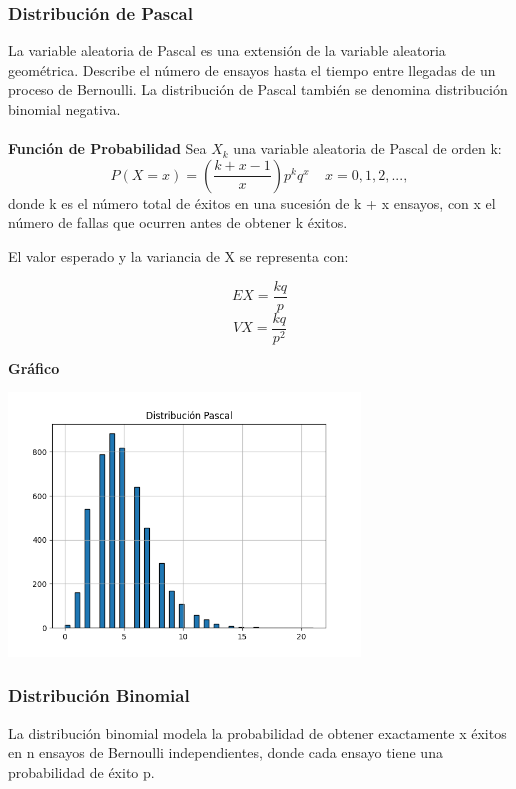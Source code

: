 \documentclass[11pt]{article}
\begin{document}
\subsubsection{Distribución de Pascal}
La variable aleatoria de Pascal es una extensión de la variable aleatoria geométrica. Describe el número de ensayos hasta el tiempo entre llegadas de un proceso de Bernoulli. La distribución de Pascal también se denomina distribución binomial negativa.
\\ \\
\noindent\textbf{Función de Probabilidad\newline}
Sea $X_k$ una variable aleatoria de Pascal de orden k:
 \begin{equation}
    P(X = x) = (\frac{k+x-1}{x})p^{k}q^{x} \ \text{   } \ x = 0,1,2,...,
  \end{equation}
  donde k es el número total de éxitos en una sucesión de k + x ensayos, con x el número de fallas que ocurren antes de obtener k éxitos.

  El valor esperado y la variancia de X se representa con:

  \begin{equation}
    EX = \frac{kq}{p}
  \end{equation}
  \begin{equation}
    VX = \frac{kq}{p^2}
  \end{equation}

\noindent\textbf{Gráfico\newline}
\begin{center}
\includegraphics[width=0.7\textwidth]{Images/histograma_pascal.png}
\end{center}
  

\subsubsection{Distribución Binomial}
La distribución binomial modela la probabilidad de obtener exactamente x éxitos en n ensayos de Bernoulli independientes, donde cada ensayo tiene una probabilidad de éxito p.
\end{document}
